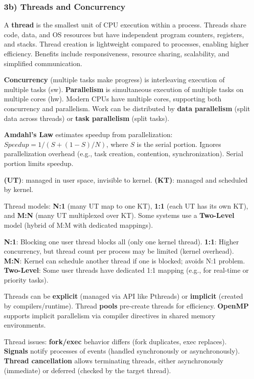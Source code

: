 \subsubsection*{3b) Threads and Concurrency}

A \textbf{thread} is the smallest unit of CPU execution within a process. Threads share code, data, and OS resources but have independent program counters, registers, and stacks. Thread creation is lightweight compared to processes, enabling higher efficiency. Benefits include responsiveness, resource sharing, scalability, and simplified communication.

\textbf{Concurrency} (multiple tasks make progress) is interleaving execution of multiple tasks (sw). \textbf{Parallelism} is simultaneous execution of multiple tasks on multiple cores (hw). Modern CPUs have multiple cores, supporting both concurrency and parallelism. Work can be distributed by \textbf{data parallelism} (split data across threads) or \textbf{task parallelism} (split tasks).

\textbf{Amdahl's Law} estimates speedup from parallelization: $Speedup = 1 / (S + (1-S)/N)$, where $S$ is the serial portion.
Ignores parallelization overhead (e.g., task creation, contention, synchronization).
Serial portion limits speedup.

\textbf{(UT)}: managed in user space, invisible to kernel.
\textbf{(KT)}: managed and scheduled by kernel.

Thread models: \textbf{N:1} (many UT map to one KT), \textbf{1:1} (each UT has its own KT), and \textbf{M:N} (many UT multiplexed over KT). Some systems use a \textbf{Two-Level} model (hybrid of M:M with dedicated mappings).

\textbf{N:1}: Blocking one user thread blocks all (only one kernel thread).
\textbf{1:1}: Higher concurrency, but thread count per process may be limited (kernel overhead).
\textbf{M:N}: Kernel can schedule another thread if one is blocked; avoids N:1 problem.
\textbf{Two-Level}: Some user threads have dedicated 1:1 mapping (e.g., for real-time or priority tasks).


Threads can be \textbf{explicit} (managed via API like Pthreads) or \textbf{implicit} (created by compilers/runtime). Thread \textbf{pools} pre-create threads for efficiency. \textbf{OpenMP} supports implicit parallelism via compiler directives in shared memory environments.

Thread issues: \textbf{fork/exec} behavior differs (fork duplicates, exec replaces). \textbf{Signals} notify processes of events (handled synchronously or asynchronously). \textbf{Thread cancellation} allows terminating threads, either asynchronously (immediate) or deferred (checked by the target thread).

